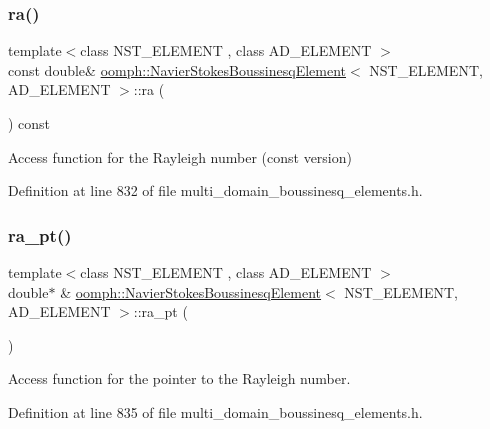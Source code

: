 \subsubsection{\texorpdfstring{ra()}{ra()}}
{\footnotesize\ttfamily template$<$class N\+S\+T\+\_\+\+E\+L\+E\+M\+E\+NT , class A\+D\+\_\+\+E\+L\+E\+M\+E\+NT $>$ \\
const double\& \hyperlink{classoomph_1_1NavierStokesBoussinesqElement}{oomph\+::\+Navier\+Stokes\+Boussinesq\+Element}$<$ N\+S\+T\+\_\+\+E\+L\+E\+M\+E\+NT, A\+D\+\_\+\+E\+L\+E\+M\+E\+NT $>$\+::ra (\begin{DoxyParamCaption}{ }\end{DoxyParamCaption}) const\hspace{0.3cm}{\ttfamily [inline]}}



Access function for the Rayleigh number (const version) 



Definition at line 832 of file multi\+\_\+domain\+\_\+boussinesq\+\_\+elements.\+h.

\mbox{\label{classoomph_1_1NavierStokesBoussinesqElement_ac822ef74e7bc0e55c917e58f2cd5a6fe}} 
\subsubsection{\texorpdfstring{ra\+\_\+pt()}{ra\_pt()}}
{\footnotesize\ttfamily template$<$class N\+S\+T\+\_\+\+E\+L\+E\+M\+E\+NT , class A\+D\+\_\+\+E\+L\+E\+M\+E\+NT $>$ \\
double$\ast$ \& \hyperlink{classoomph_1_1NavierStokesBoussinesqElement}{oomph\+::\+Navier\+Stokes\+Boussinesq\+Element}$<$ N\+S\+T\+\_\+\+E\+L\+E\+M\+E\+NT, A\+D\+\_\+\+E\+L\+E\+M\+E\+NT $>$\+::ra\+\_\+pt (\begin{DoxyParamCaption}{ }\end{DoxyParamCaption})\hspace{0.3cm}{\ttfamily [inline]}}



Access function for the pointer to the Rayleigh number. 



Definition at line 835 of file multi\+\_\+domain\+\_\+boussinesq\+\_\+elements.\+h.



